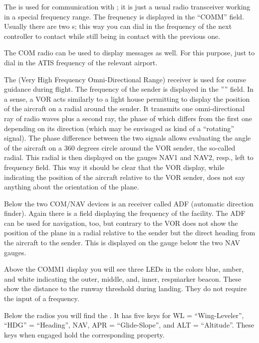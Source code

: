 The  is used for communication with ; it is just a usual radio transceiver working in a special frequency
range.
The frequency is displayed in the ``COMM'' field. Usually there are two
s; this way you can dial in the frequency of the next controller to
contact
while still being in contact with the previous one.

The COM radio can be used to display  messages as well. For
this purpose, just to dial in the ATIS frequency of the relevant
airport.

The  (Very High Frequency Omni-Directional Range) receiver is used
for course
guidance during flight. The frequency of the sender is displayed in the
'''' field. In a sense,
a VOR acts similarly to a light house permitting to display the position of the
aircraft on a radial around the sender. It transmits one omni-directional ray of
radio
waves plus a second ray, the phase of which differs from the first one depending
on its
direction (which may be envisaged as kind of a ``rotating'' signal). The phase
difference between the two
signals allows evaluating the angle of the aircraft on a 360 degrees circle
around the VOR sender, the so-called radial. This radial is then displayed on
the gauges
NAV1 and NAV2, resp., left to frequency field. This way it should be clear that
the VOR display, while
indicating the position of the aircraft relative to the VOR sender, does not say
anything about the orientation of the plane.

Below the two COM/NAV devices is an  receiver called ADF (automatic
direction
finder). Again there is a field displaying the frequency of the facility. The
ADF can be
used for navigation, too, but contrary to the VOR does not show the position of
the plane
in a radial relative to the sender but the direct heading from the aircraft to
the
sender. This is displayed on the gauge below the two NAV gauges.

Above the COMM1 display you will see three LEDs in the colors blue, amber, and
white
indicating the outer, middle, and, inner, resp\. marker beacon. These show the distance to the
runway
threshold during landing. They do not require the input of a frequency.

Below the radios you will find the . It has five keys
for WL = ``Wing-Leveler'', ``HDG'' = ``Heading'', NAV, APR =
``Glide-Slope'', and ALT = ``Altitude''. These keys when engaged hold
the corresponding property.


